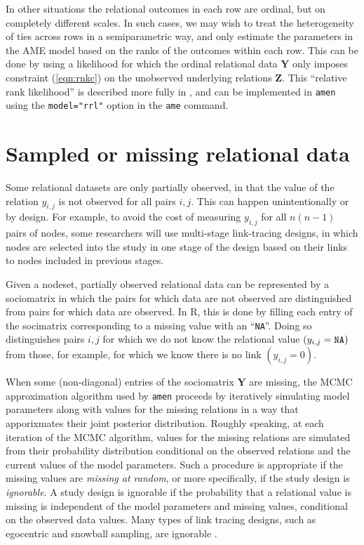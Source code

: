 \documentclass[11pt]{article}\usepackage[]{graphicx}\usepackage[]{color}
\newcommand{\bl}[1]{{\mathbf #1}}
\begin{document}
In other situations the relational outcomes in each 
row are ordinal, but on completely different scales. 
In such cases, we may wish to treat the heterogeneity of 
ties across rows in a semiparametric way, and only 
estimate the parameters in the AME model based on the 
ranks of the outcomes within each row.  
This can be done by using a likelihood 
for which the ordinal relational data $\bl Y$ only imposes 
constraint (\ref{eqn:rnkc}) on the unobserved underlying 
relations $\bl Z$.  
This ``relative rank likelihood'' is described more fully in 
\citet{hoff_fosdick_volfovsky_stovel_2013}, 
and can be implemented in {\tt amen} using the {\tt model="rrl"} option in the
{\tt ame} command.



\section{Sampled or missing relational data}
Some relational datasets are only partially observed, in that 
the value of the relation $y_{i,j}$ is not observed for all pairs 
$i,j$.  This can happen unintentionally or by design. 
For example, to avoid the cost of measuring $y_{i,j}$ for 
all $n(n-1)$ pairs of nodes, some researchers will use 
multi-stage link-tracing designs, in which 
nodes are selected into the study in one stage of the 
design based on their links to nodes included in previous 
stages. 


Given a nodeset, partially observed relational data 
can be represented by a sociomatrix in which the 
pairs for which data are not observed  are distinguished 
from pairs for which data are observed. 
In {\sf R}, this is done by 
filling each entry of the socimatrix 
corresponding to a missing value with an ``{\tt NA}''. 
Doing so distinguishes
pairs $i,j$ for which we do not know the relational value 
$(y_{i,j} = {\tt NA})$ from those, for example,  
for which we know there is no link $(y_{i,j}=0)$. 

When some (non-diagonal) entries of the sociomatrix $\bl Y$ are missing, 
the MCMC approximation algorithm used by {\tt amen}
proceeds by iteratively simulating
model parameters 
along with 
values for the missing relations in a way that 
apporixmates their joint posterior distribution.
Roughly speaking, at each iteration  of the MCMC algorithm, 
values for the missing relations are simulated from 
their probability distribution conditional on the observed 
relations and the current values of the model parameters. 
Such a procedure is appropriate if the missing values 
are \emph{missing at random}, or more specifically, if the 
study design is \emph{ignorable}. 
A study design is ignorable if 
the probability that a relational value is 
missing is independent of the model parameters and missing 
values, conditional on the observed data values. 
Many types of link tracing designs, such as egocentric and snowball sampling, 
are ignorable \citep{thompson_frank_2000}. 
\end{document}
